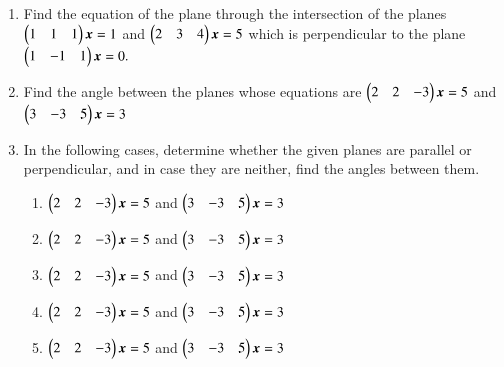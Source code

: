 \begin{enumerate}[label=\arabic*.,ref=\thesubsection.\theenumi]
%
\item  Find the equation of the plane through the intersection of the planes
$
\begin{pmatrix}1 & 1 & 1\end{pmatrix}\bm{x}=1
$
 and 
$
\begin{pmatrix}2 & 3 & 4\end{pmatrix}\bm{x}=5
$
which is perpendicular to the plane 
$
\begin{pmatrix}1 & -1 & 1\end{pmatrix}\bm{x}=0.
$
%
\item Find the angle between the planes whose equations are
$
\begin{pmatrix}2 & 2 & -3\end{pmatrix}\bm{x}=5
$
 and 
$
\begin{pmatrix}3 & -3 & 5\end{pmatrix}\bm{x}=3
$
%
\item In the following cases, determine whether the given planes are parallel or perpendicular, and in case they are neither, find the angles between them.
\begin{enumerate}
\item 
$
\begin{pmatrix}2 & 2 & -3\end{pmatrix}\bm{x}=5
$
 and 
$
\begin{pmatrix}3 & -3 & 5\end{pmatrix}\bm{x}=3
$
%
\item 
$
\begin{pmatrix}2 & 2 & -3\end{pmatrix}\bm{x}=5
$
 and 
$
\begin{pmatrix}3 & -3 & 5\end{pmatrix}\bm{x}=3
$
%
\item 
$
\begin{pmatrix}2 & 2 & -3\end{pmatrix}\bm{x}=5
$
 and 
$
\begin{pmatrix}3 & -3 & 5\end{pmatrix}\bm{x}=3
$
\item 
$
\begin{pmatrix}2 & 2 & -3\end{pmatrix}\bm{x}=5
$
 and 
$
\begin{pmatrix}3 & -3 & 5\end{pmatrix}\bm{x}=3
$
\item 
$
\begin{pmatrix}2 & 2 & -3\end{pmatrix}\bm{x}=5
$
 and 
$
\begin{pmatrix}3 & -3 & 5\end{pmatrix}\bm{x}=3
$
\end{enumerate}
\end{enumerate}
